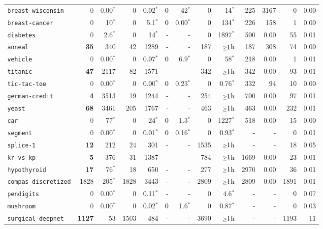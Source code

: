 \begin{tabular}{lrrrrrrrrrrrr}
\texttt{breast-wisconsin} & 0 & 0.00$^*$ & 0 & 0.02$^*$ & 0 & 42$^*$ & 0 & 14$^*$ & 225 & 3167 & 0 & 0.00\\
\texttt{breast-cancer} & 0 & 10$^*$ & 0 & 5.1$^*$ & 0 & 0.00$^*$ & 0 & 134$^*$ & 226 & 158 & 1 & 0.00\\
\texttt{diabetes} & 0 & 2.6$^*$ & 0 & 14$^*$ & - & - & 0 & 1897$^*$ & 500 & 0.00 & 55 & 0.01\\
\texttt{anneal} & \textbf{35} & 340 & 42 & 1289 & - & - & 187 & $\mathsmaller{\geq}1$h & 187 & 308 & 74 & 0.00\\
\texttt{vehicle} & 0 & 0.00$^*$ & 0 & 0.07$^*$ & 0 & 6.9$^*$ & 0 & 58$^*$ & 218 & 0.00 & 1 & 0.01\\
\texttt{titanic} & \textbf{47} & 2117 & 82 & 1571 & - & - & 342 & $\mathsmaller{\geq}1$h & 342 & 0.00 & 93 & 0.01\\
\texttt{tic-tac-toe} & 0 & 0.00$^*$ & 0 & 0.00$^*$ & 0 & 0.23$^*$ & 0 & 0.76$^*$ & 332 & 94 & 10 & 0.00\\
\texttt{german-credit} & \textbf{4} & 3513 & 19 & 1244 & - & - & 254 & $\mathsmaller{\geq}1$h & 700 & 0.00 & 97 & 0.01\\
\texttt{yeast} & \textbf{68} & 3461 & 205 & 1767 & - & - & 463 & $\mathsmaller{\geq}1$h & 463 & 0.00 & 232 & 0.01\\
\texttt{car} & 0 & 77$^*$ & 0 & 24$^*$ & 0 & 1.3$^*$ & 0 & 1227$^*$ & 518 & 0.00 & 15 & 0.00\\
\texttt{segment} & 0 & 0.00$^*$ & 0 & 0.01$^*$ & 0 & 0.16$^*$ & 0 & 0.93$^*$ & - & - & 0 & 0.01\\
\texttt{splice-1} & \textbf{12} & 212 & 24 & 301 & - & - & 1535 & $\mathsmaller{\geq}1$h & - & - & 18 & 0.05\\
\texttt{kr-vs-kp} & \textbf{5} & 376 & 31 & 1387 & - & - & 784 & $\mathsmaller{\geq}1$h & 1669 & 0.00 & 23 & 0.01\\
\texttt{hypothyroid} & \textbf{17} & 76$^*$ & 18 & 650 & - & - & 277 & $\mathsmaller{\geq}1$h & 2970 & 0.00 & 36 & 0.01\\
\texttt{compas\_discretized} & 1828 & 205$^*$ & 1828 & 3443 & - & - & 2809 & $\mathsmaller{\geq}1$h & 2809 & 0.00 & 1891 & 0.01\\
\texttt{pendigits} & 0 & 0.00$^*$ & 0 & 0.11$^*$ & - & - & 0 & 4.6$^*$ & - & - & 0 & 0.07\\
\texttt{mushroom} & 0 & 0.00$^*$ & 0 & 0.02$^*$ & 0 & 1.6$^*$ & 0 & 0.87$^*$ & - & - & 0 & 0.03\\
\texttt{surgical-deepnet} & \textbf{1127} & 53 & 1503 & 484 & - & - & 3690 & $\mathsmaller{\geq}1$h & - & - & 1193 & 11\\

\end{tabular}
